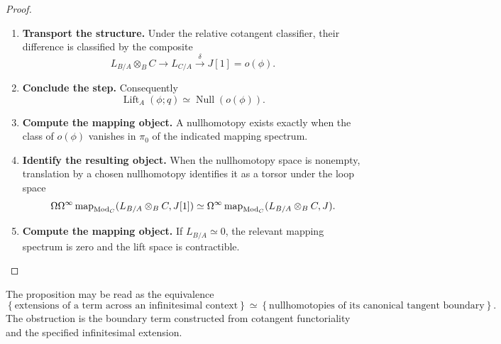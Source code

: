 \begin{proof}
\begin{enumerate}[label=\textup{(\arabic*)}]
    \item \textbf{Transport the structure.}
    Under the relative cotangent classifier, their difference is classified by the composite
    \[
        L_{B/A}\otimes_BC
        \longrightarrow
        L_{C/A}
        \xrightarrow{\delta}
        J[1]
        =o(\phi).
    \]

    \item \textbf{Conclude the step.}
    Consequently
    \[
        \operatorname{Lift}_A(\phi;q)
        \simeq
        \operatorname{Null}(o(\phi)).
    \]

    \item \textbf{Compute the mapping object.}
    A nullhomotopy exists exactly when the class of \(o(\phi)\) vanishes in \(\pi_0\) of the
    indicated mapping spectrum.

    \item \textbf{Identify the resulting object.}
    When the nullhomotopy space is nonempty, translation by a chosen nullhomotopy identifies it
    as a torsor under the loop space
    \[
        \Omega\Omega^\infty
        \operatorname{map}_{\operatorname{Mod}_C}(L_{B/A}\otimes_BC,J[1])
        \simeq
        \Omega^\infty
        \operatorname{map}_{\operatorname{Mod}_C}(L_{B/A}\otimes_BC,J).
    \]

    \item \textbf{Compute the mapping object.}
    If \(L_{B/A}\simeq0\), the relevant mapping spectrum is zero and the lift space is contractible.
\end{enumerate}
\end{proof}

\begin{remark}
\label{rem:lifting-judgment}
The proposition may be read as the equivalence
\[
    \left\{
    \text{extensions of a term across an infinitesimal context}
    \right\}
    \simeq
    \left\{
    \text{nullhomotopies of its canonical tangent boundary}
    \right\}.
\]
The obstruction is the boundary term constructed from cotangent functoriality
and the specified infinitesimal extension.
\end{remark}

